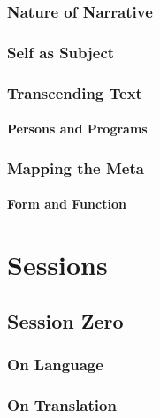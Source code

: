 \documentclass[10pt,twoside,twocolumn,openany,nomultitoc]{book}
\begin{document}
\section{Nature of Narrative}\vspace{2pt}

\section{Self as Subject}

\section{Transcending Text}
\subsection{Persons and Programs}

\section{Mapping the Meta}
  
\subsection{Form and Function}

\part{Sessions}

\chapter{Session Zero}\vspace{6pt}

\begin{DndReadAloud}
  \lipsum[1]
\end{DndReadAloud}


\section{On Language}

\section{On Translation}
    \lipsum[1]
\end{document}
